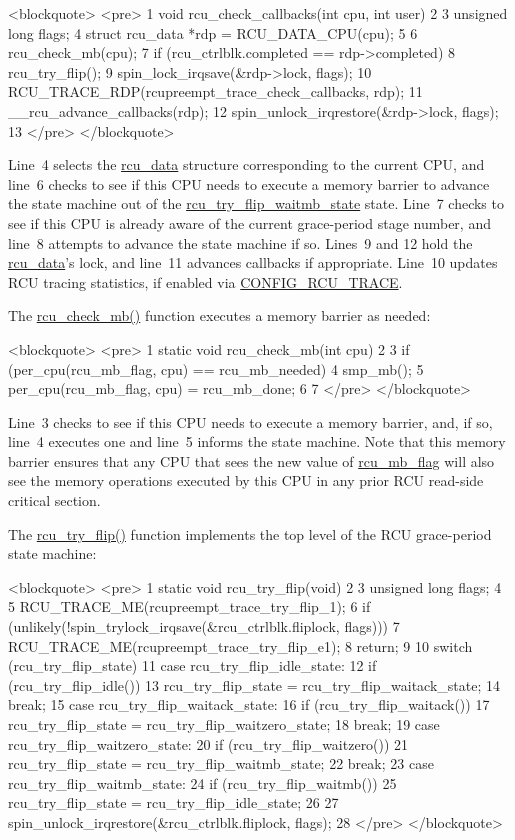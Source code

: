 <blockquote>
<pre>  1 void rcu_check_callbacks(int cpu, int user)
  2 {
  3   unsigned long flags;
  4   struct rcu_data *rdp = RCU_DATA_CPU(cpu);
  5 
  6   rcu_check_mb(cpu);
  7   if (rcu_ctrlblk.completed == rdp->completed)
  8     rcu_try_flip();
  9   spin_lock_irqsave(&rdp->lock, flags);
 10   RCU_TRACE_RDP(rcupreempt_trace_check_callbacks, rdp);
 11   __rcu_advance_callbacks(rdp);
 12   spin_unlock_irqrestore(&rdp->lock, flags);
 13 }
</pre>
</blockquote>

Line~4 selects the \url{rcu_data} structure corresponding
to the current CPU, and line~6 checks to see if this CPU needs
to execute a memory barrier to advance the state machine out of the
\url{rcu_try_flip_waitmb_state} state.
Line~7 checks to see if this CPU is already aware of the
current grace-period stage number, and line~8 attempts to advance the
state machine if so.
Lines~9 and 12 hold the \url{rcu_data}'s lock, and
line~11 advances callbacks if appropriate.
Line~10 updates RCU tracing statistics, if enabled via
\url{CONFIG_RCU_TRACE}.

The \url{rcu_check_mb()} function executes a memory barrier
as needed:

<blockquote>
<pre>  1 static void rcu_check_mb(int cpu)
  2 {
  3   if (per_cpu(rcu_mb_flag, cpu) == rcu_mb_needed) {
  4     smp_mb();
  5     per_cpu(rcu_mb_flag, cpu) = rcu_mb_done;
  6   }
  7 }
</pre>
</blockquote>

Line~3 checks to see if this CPU needs to execute a memory barrier,
and, if so, line~4 executes one and line~5 informs the state
machine.
Note that this memory barrier ensures that any CPU that sees the new
value of \url{rcu_mb_flag} will also see the memory operations
executed by this CPU in any prior RCU read-side critical section.

The \url{rcu_try_flip()} function implements the top level of
the RCU grace-period state machine:

<blockquote>
<pre>  1 static void rcu_try_flip(void)
  2 {
  3   unsigned long flags;
  4 
  5   RCU_TRACE_ME(rcupreempt_trace_try_flip_1);
  6   if (unlikely(!spin_trylock_irqsave(&rcu_ctrlblk.fliplock, flags))) {
  7     RCU_TRACE_ME(rcupreempt_trace_try_flip_e1);
  8     return;
  9   }
 10   switch (rcu_try_flip_state) {
 11   case rcu_try_flip_idle_state:
 12     if (rcu_try_flip_idle())
 13       rcu_try_flip_state = rcu_try_flip_waitack_state;
 14     break;
 15   case rcu_try_flip_waitack_state:
 16     if (rcu_try_flip_waitack())
 17       rcu_try_flip_state = rcu_try_flip_waitzero_state;
 18     break;
 19   case rcu_try_flip_waitzero_state:
 20     if (rcu_try_flip_waitzero())
 21       rcu_try_flip_state = rcu_try_flip_waitmb_state;
 22     break;
 23   case rcu_try_flip_waitmb_state:
 24     if (rcu_try_flip_waitmb())
 25       rcu_try_flip_state = rcu_try_flip_idle_state;
 26   }
 27   spin_unlock_irqrestore(&rcu_ctrlblk.fliplock, flags);
 28 }
</pre>
</blockquote>

